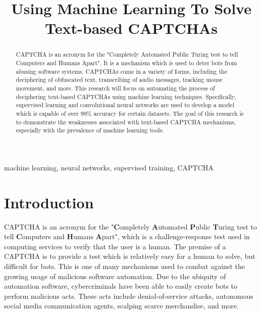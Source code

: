 \documentclass[11pt,conference]{IEEEtran}
\begin{document}
\title{Using Machine Learning To Solve Text-based CAPTCHAs\\
}

\author{
}

\maketitle

\begin{abstract}
	CAPTCHA is an acronym for the "Completely Automated Public Turing test
	to tell Computers and Humans Apart". It is a mechanism which is used to
	deter bots from abusing software systems. CAPTCHAs come in a variety of forms,
	including the deciphering of obfuscated text, transcribing of audio messages,
	tracking mouse movement, and more. This research will focus on automating the
	process of deciphering text-based CAPTCHAs using machine learning
	techniques. Specifically, supervised learning and convolutional neural
	networks are used to develop
	a model which is capable of over 99\% accuracy for certain datasets. 
	The goal of this research is to demonstrate the weaknesses associated with text-based
	CAPTCHA mechanisms, especially with the prevalence of machine learning
	tools.
\end{abstract}

\begin{IEEEkeywords}
	machine learning, neural networks, supervised training, CAPTCHA
\end{IEEEkeywords}

\section{Introduction}
CAPTCHA is an acronym for the "\textbf{C}ompletely \textbf{A}utomated
\textbf{P}ublic \textbf{T}uring test to tell
\textbf{C}omputers and \textbf{H}umans \textbf{A}part", which is a
challenge-response test used in computing services to verify that the user is a
human. The premise of a CAPTCHA is to provide a test which is relatively easy
for a human to solve, but difficult for bots. This is one of many 
mechanisms used to combat against the growing usage of malicious software
automation. Due to the ubiquity of automation software, cybercriminals have
been able to easily create bots to perform malicious acts. These acts include
denial-of-service attacks, autonomous social media communication agents,
scalping scarce merchandise, and more.
\end{document}

